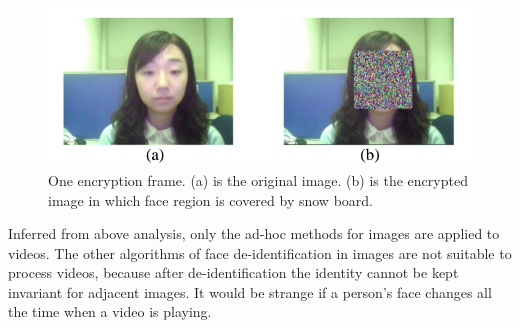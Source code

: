 	\begin{figure}[!htb]
	    \centering
	    \includegraphics{figure/encrypt}
	    \caption{One encryption frame. (a) is the original image. (b) is the 
	    	encrypted image in which face region is covered by snow board.}
	    \label{fig:encrypt}
  	\end{figure}

  	Inferred from above analysis, only the ad-hoc methods for images are applied to videos. The other algorithms
	of face de-identification in images are not suitable to process videos, because after de-identification the identity 
	cannot be kept invariant for adjacent images. It would be strange if a person's face changes all the time
	when a video is playing.
	